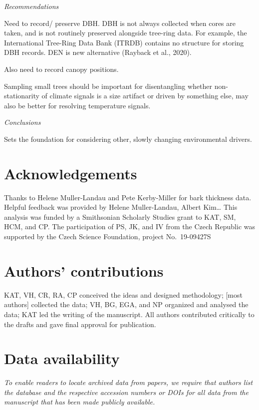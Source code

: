 \documentclass[
]{article}
\begin{document}
\emph{Recommendations}

Need to record/ preserve DBH. DBH is not always collected when cores are
taken, and is not routinely preserved alongside tree-ring data. For
example, the International Tree-Ring Data Bank (ITRDB) contains no
structure for storing DBH records. DEN is new alternative (Rayback et
al., 2020).

Also need to record canopy positions.

Sampling small trees should be important for disentangling whether
non-stationarity of climate signals is a size artifact or driven by
something else, may also be better for resolving temperature signals.

\emph{Conclusions}

Sets the foundation for considering other, slowly changing environmental
drivers.

\hypertarget{acknowledgements}{%
\section{Acknowledgements}\label{acknowledgements}}

Thanks to Helene Muller-Landau and Pete Kerby-Miller for bark thickness
data. Helpful feedback was provided by Helene Muller-Landau, Albert
Kim\ldots{} This analysis was funded by a Smithsonian Scholarly Studies
grant to KAT, SM, HCM, and CP. The participation of PS, JK, and IV from
the Czech Republic was supported by the Czech Science Foundation,
project No.~19-09427S

\hypertarget{authors-contributions}{%
\section{Authors' contributions}\label{authors-contributions}}

KAT, VH, CR, RA, CP conceived the ideas and designed methodology;
{[}most authors{]} collected the data; VH, BG, EGA, and NP organized and
analysed the data; KAT led the writing of the manuscript. All authors
contributed critically to the drafts and gave final approval for
publication.

\hypertarget{data-availability}{%
\section{Data availability}\label{data-availability}}

\emph{To enable readers to locate archived data from papers, we require
that authors list the database and the respective accession numbers or
DOIs for all data from the manuscript that has been made publicly
available.}
\end{document}
